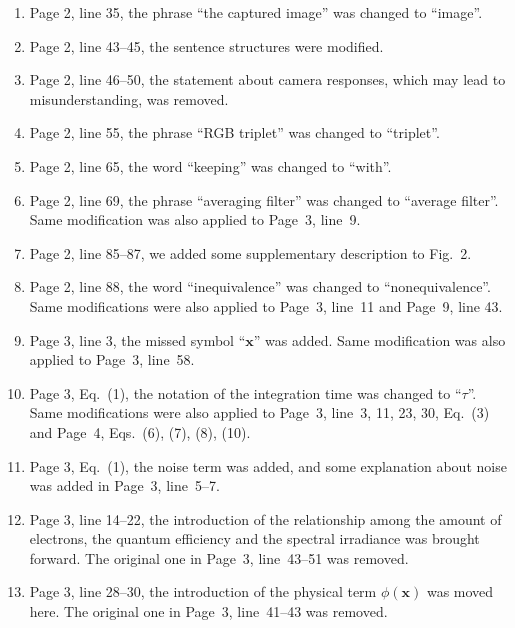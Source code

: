\documentclass[12pt]{article}
\begin{document}
	\begin{enumerate}[resume]
		\item Page 2, line 35, the phrase ``the captured image'' was changed to ``image''.
		
		\item Page 2, line 43--45, the sentence structures were modified.
		
		\item Page 2, line 46--50, the statement about camera responses, which may lead to misunderstanding, was removed.
		
		\item Page 2, line 55, the phrase ``RGB triplet'' was changed to ``triplet''.
		
		\item Page 2, line 65, the word ``keeping'' was changed to ``with''.
		
		\item Page 2, line 69, the phrase ``averaging filter'' was changed to ``average filter''. Same modification was also applied to Page~3, line~9.
		
		\item Page 2, line 85--87, we added some supplementary description to Fig.~2.
		
		\item Page 2, line 88, the word ``inequivalence'' was changed to ``nonequivalence''. Same modifications were also applied to Page~3, line~11 and Page~9, line 43.
		
		\item Page 3, line 3, the missed symbol ``$\mathbf{x}$'' was added. Same modification was also applied to Page~3, line~58.
		
		\item Page 3, Eq.~(1), the notation of the integration time was changed to ``$\tau$''. Same modifications were also applied to Page~3, line~3, 11, 23, 30, Eq.~(3) and Page~4, Eqs.~(6), (7), (8), (10).
		
		\item Page 3, Eq.~(1), the noise term was added, and some explanation about noise was added in Page~3, line~5--7.
		
		\item Page 3, line 14--22, the introduction of the relationship among the amount of electrons, the quantum efficiency and the spectral irradiance was brought forward. The original one in Page~3, line~43--51 was removed.
		
		\item Page 3, line 28--30, the introduction of the physical term $\phi(\mathbf{x})$ was moved here. The original one in Page~3, line~41--43 was removed.
		

\end{enumerate}
\end{document}

